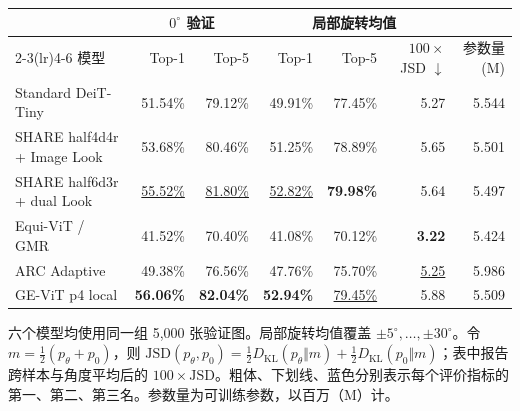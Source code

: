 \documentclass[border=8pt]{standalone}
\newcommand{\third}[1]{\textcolor{thirdblue}{#1}}
\begin{document}
\begin{minipage}{19.2cm}
  \centering
  \small
  \setlength{\tabcolsep}{7.2pt}
  \renewcommand{\arraystretch}{1.22}
  \begin{tabular}{lrrrrrr}
    \toprule
    & \multicolumn{2}{c}{$0^\circ$ 验证} & \multicolumn{3}{c}{局部旋转均值} & \\
    \cmidrule(lr){2-3}\cmidrule(lr){4-6}
    模型 & Top-1 & Top-5 & Top-1 & Top-5 & $100\!\times$ JSD $\downarrow$ & 参数量 (M) \\
    \midrule
    Standard DeiT-Tiny             & 51.54\% & 79.12\% & 49.91\% & 77.45\% & \third{5.27} & 5.544 \\
    SHARE half4d4r + Image Look    & \third{53.68\%} & \third{80.46\%} & \third{51.25\%} & \third{78.89\%} & 5.65 & 5.501 \\
    SHARE half6d3r + dual Look     & \underline{55.52\%} & \underline{81.80\%} & \underline{52.82\%} & \textbf{79.98\%} & 5.64 & 5.497 \\
    Equi-ViT / GMR                 & 41.52\% & 70.40\% & 41.08\% & 70.12\% & \textbf{3.22} & 5.424 \\
    ARC Adaptive                   & 49.38\% & 76.56\% & 47.76\% & 75.70\% & \underline{5.25} & 5.986 \\
    GE-ViT p4 local                & \textbf{56.06\%} & \textbf{82.04\%} & \textbf{52.94\%} & \underline{79.45\%} & 5.88 & 5.509 \\
    \bottomrule
  \end{tabular}

  \vspace{0.28cm}
  \footnotesize
  六个模型均使用同一组 5,000 张验证图。局部旋转均值覆盖
  $\pm5^\circ,\ldots,\pm30^\circ$。令
  $m=\tfrac12(p_\theta+p_0)$，则
  $\mathrm{JSD}(p_\theta,p_0)=\tfrac12D_{\mathrm{KL}}(p_\theta\Vert m)
  +\tfrac12D_{\mathrm{KL}}(p_0\Vert m)$；表中报告跨样本与角度平均后的
  $100\times\mathrm{JSD}$。粗体、下划线、蓝色分别表示每个评价指标的
  第一、第二、第三名。参数量为可训练参数，以百万（M）计。
\end{minipage}
\end{document}
